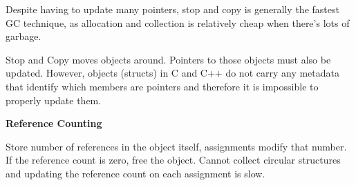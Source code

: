 Despite having to update many pointers, stop and copy is generally the fastest GC technique, as allocation and collection is relatively cheap when there's lots of garbage.


Stop and Copy moves objects around. Pointers to those objects must also be updated. However, objects (structs) in C and C++ do not carry any metadata that identify which members are pointers and therefore it is impossible to properly update them.\medskip

\textbf{Reference Counting }\smallskip

Store number of references in the object itself, assignments modify that number. If the reference count is zero, free the object. Cannot collect circular structures and updating the reference count on each assignment is slow.
